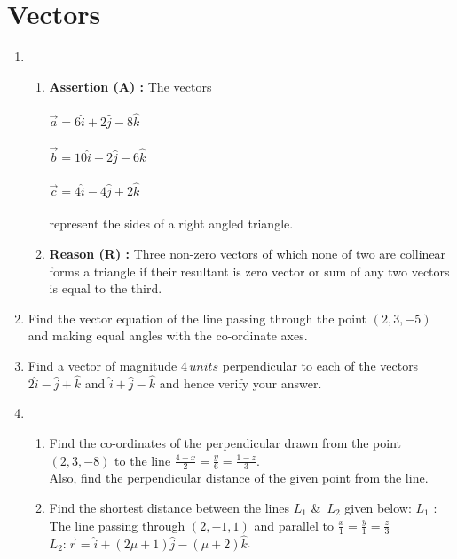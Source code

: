 \documentclass[12pt,-letter paper]{article}
\providecommand{\brak}[1]{\ensuremath{\left(#1\right)}}
\begin{document}
\section {Vectors}
\begin {enumerate}
\item   \begin {enumerate}
\item [] \textbf{Assertion (A) :} The vectors \\ \\
                $ \vec{a}=6\hat{i}+2\hat{j}-8\hat{k}$ \\ \\
                $ \vec{b} = 10\hat{i}-2\hat{j}-6\hat{k}$  \\ \\
                $ \vec{c} = 4\hat{i}-4\hat{j}+2\hat{k}$  \\ \\
                represent the sides of a right angled triangle.
\item [] \textbf{Reason (R)    :} Three non-zero vectors of which none of two are collinear forms a triangle if their resultant is zero vector or sum of any two vectors is equal to the third.
        \end {enumerate}

\item Find the vector equation of the line passing through the point \brak{2, 3, -5} and making equal angles with the co-ordinate axes.
                                                                                                                                                                                                                              \item Find a vector of magnitude $4\,units$ perpendicular to each of the vectors $2\hat{i}-\hat{j}+\hat{k}$ and $\hat{i}+\hat{j}-\hat{k}$ and hence verify your answer.

\item \begin {enumerate}
\item Find the co-ordinates of the perpendicular drawn from the point \brak{2, 3, -8} to the line $\frac{4-x}{2}=\frac{y}{6}=\frac{1-z}{3}$.\\Also, find the perpendicular distance of the given point from the line.
\item Find the shortest distance between the lines $L_1$ \&\ $L_2$ given below:  $L_1$ : The line passing through $\brak{2, -1, 1}$ and parallel to $\frac{x}{1}=\frac{y}{1}=\frac{z}{3}$ \\ $ L_2: \vec{r} = \hat{i}+(2\mu+1)\hat{j}-(\mu+2)\hat{k}$.
        \end {enumerate}
\end {enumerate}
\newpage
\end{document}

